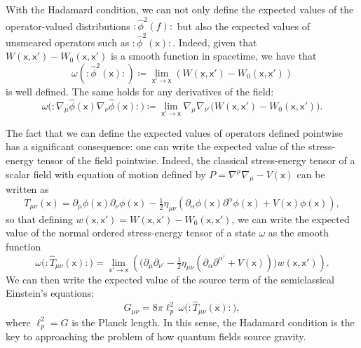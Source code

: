 \documentclass[letterpaper,12pt,titlepage,oneside,final]{book}
\newcommand{\normord}[1]{\vcentcolon\mathrel{#1}\vcentcolon}
\providecommand{\vcentcolon}{\mathrel{\mathop{:}}}
\newcommand{\mf}{\mathsf}%
\begin{document}
With the Hadamard condition, we can not only define the expected values of the operator-valued distributions $\normord{\hat{\phi}^2(f)}$ but also the expected values of unsmeared operators such as $\normord{\hat{\phi}^2(\mf x)}$. Indeed, given that $W(\mf x,\mf x') - W_0(\mf x, \mf x')$ is a smooth function in spacetime, we have that
\begin{equation}
    \omega(\normord{\hat{\phi}^2(\mf x)}) \coloneqq \lim_{\mf x'  \to \mf x} \left(W(\mf x,\mf x') - W_0(\mf x, \mf x')\right)
\end{equation}
is well defined. The same holds for any derivatives of the field:
\begin{equation}
    \omega\big(\!\!\normord{\nabla_\mu\hat{\phi}(\mf x)\nabla_\nu\hat{\phi}(\mf x)}\!\!\big) \coloneqq \lim_{\mf x'  \to \mf x} \nabla_\mu \nabla_{\nu'}\big( W(\mf x,\mf x') -  W_0(\mf x, \mf x')\big).
\end{equation}


The fact that we can define the expected values of operators defined pointwise has a significant consequence: one can write the expected value of the stress-energy tensor of the field pointwise. Indeed, the classical stress-energy tensor of a scalar field with equation of motion defined by $P = \nabla^\mu \nabla_\mu - V(\mf x)$ can be written as
\begin{equation}
    T_{\mu\nu}(\mf x) = \partial_\mu \phi(\mf x) \partial_\nu \phi(\mf x) - \tfrac{1}{2}\eta_{\mu\nu}\left(\partial_\alpha\phi(\mf x) \partial^\alpha\phi(\mf x) + V(\mf x) \phi(\mf x)\right),    
\end{equation}
so that defining $w(\mf x, \mf x') = W(\mf x, \mf x') - W_0(\mf x, \mf x')$, we can write the expected value of the normal ordered stress-energy tensor of a state $\omega$ as the smooth function
\begin{equation}
    \omega\big(\!\!\normord{\hat{T}_{\mu\nu}(\mf x)}\!\!\big) = \lim_{\mf x' \to \mf x} \left(\big(\partial_\mu \partial_{\nu'}  - \tfrac{1}{2}\eta_{\mu\nu}(\partial_\alpha\partial^{\alpha'} + V(\mf x))\big)w(\mf x, \mf x')\right).
\end{equation}
We can then write the expected value of the source term of the semiclassical Einstein's equations:
\begin{equation}\label{eq:EEsemi}
    G_{\mu\nu} = 8 \pi \ell_p^2 \,\omega\big(\!\!\normord{\hat{T}_{\mu\nu}(\mf x)}\!\!\big),
\end{equation}
where $\ell_p^2 = G$ is the Planck length. In this sense, the Hadamard condition is the key to approaching the problem of how quantum fields source gravity.
\end{document}
